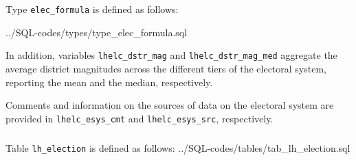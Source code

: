 Type \texttt{elec\_formula} is defined as follows:

%
{../SQL-codes/types/type_elec_formula.sql}

In addition, 
variables \texttt{lhelc\_dstr\_mag} and \texttt{lhelc\_dstr\_mag\_med} aggregate the average district magnitudes across the different tiers of the electoral system, reporting the mean and the median, respectively.

Comments and information on the sources of data on the electoral system are provided in \texttt{lhelc\_esys\_cmt} and \texttt{lhelc\_esys\_src}, respectively.

\subparagraph{}
Table \texttt{lh\_election}  is defined as follows:
%
{../SQL-codes/tables/tab_lh_election.sql}
